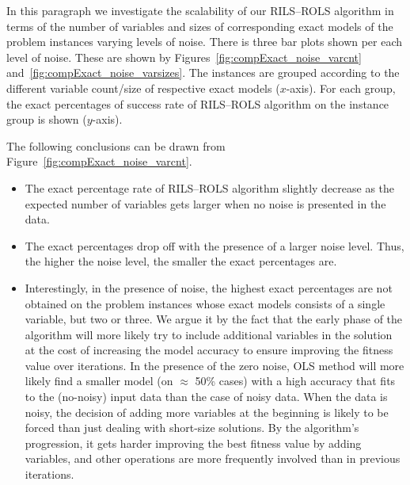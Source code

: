 \documentclass[a4paper,12pt]{elsarticle}
\begin{document}
In this paragraph we investigate the  scalability of our \textsc{RILS}--\textsc{ROLS} algorithm in terms of the number of variables and sizes of corresponding exact models of the problem instances varying levels of noise. There is three bar plots shown per each level of noise.  These are shown by Figures~\ref{fig:compExact_noise_varcnt} and~\ref{fig:compExact_noise_varsizes}. The instances are grouped according to the different variable count/size of respective exact models ($x$-axis). For each group, the exact percentages of success rate of \textsc{RILS}--\textsc{ROLS} algorithm on the instance group is shown ($y$-axis).

The following conclusions can be drawn from Figure~\ref{fig:compExact_noise_varcnt}. 

\begin{itemize}
	\item The exact percentage rate of \textsc{RILS}--\textsc{ROLS} algorithm  slightly decrease as the expected number of variables gets larger when no noise is presented in the data.
	\item The exact percentages drop off with the presence of a larger noise level. Thus, the higher the noise level, the smaller the exact percentages are.
	\item Interestingly, in the presence of noise, the highest exact percentages are not obtained on the problem instances whose exact models consists of a single variable, but two or three. We argue it by the fact that the early phase of the algorithm will more likely try to include additional variables in the solution at the cost of increasing the model accuracy to ensure improving the fitness value over iterations. In the presence of the zero noise, OLS method will more likely find a smaller model (on $\approx$ 50\% cases) with a high accuracy that fits to the (no-noisy) input data than the case of noisy data. When the data is noisy, the decision of adding more variables at the beginning is likely to be forced than just dealing with short-size solutions. By the algorithm's progression, it gets harder improving the best fitness value by adding variables, and other operations are more frequently involved than in previous iterations. %
\end{itemize}
\end{document}
